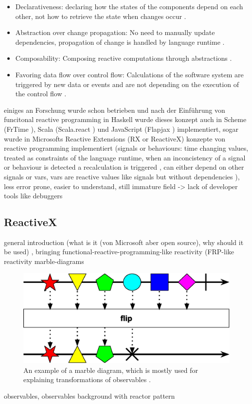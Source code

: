 \documentclass[Bachelor,BIF,english]{twbook}
\begin{document}
\begin{itemize}
\item Declarativeness: declaring how the states of the components depend on each other, not how to retrieve the state when changes occur \cite[p.~2]{PositivEffectOfRP}.
\item Abstraction over change propagation: No need to manually update dependencies, propagation of change is handled by language runtime \cite[p.~2]{PositivEffectOfRP}.
\item Composability: Composing reactive computations through abstractions \cite[p.~2]{PositivEffectOfRP}.
\item Favoring data flow over control flow: Calculations of the software system are triggered by new data or events and are not depending on the execution of the control flow \cite[p.~2]{PositivEffectOfRP}.
\end{itemize}
einiges an Forschung wurde schon betrieben und nach der Einführung von funcitonal reactive programming in Haskell wurde dieses konzept auch in Scheme (FrTime \cite{FrTime}), Scala (Scala.react \cite{DeprecatingOP}) und JavaScript (Flapjax \cite{Flapjax}) implementiert, sogar wurde in Microsofts Reactive Extensions (RX or ReactiveX) konzepte von reactive programming implementiert \cite[p.~954]{RPWalkthrough} \cite[p.~796]{DebuggingRP} \cite[p.~2]{PositivEffectOfRP}
(signals or behaviours: time changing values, treated as constraints of the language runtime, when an inconcistency of a signal or behaviour is detected a recalculation is triggered \cite[p.~797]{DebuggingRP} \cite[p.~3]{PositivEffectOfRP}, can either depend on other signals or vars, vars are reactive values like signals but without dependencies \cite[p.~2]{PositivEffectOfRP}), less error prone, easier to understand, still immature field -> lack of developer tools like debuggers \cite[p.~796]{DebuggingRP}

\subsection{ReactiveX}
general introduction (what is it \cite{ReactiveExtensions} \cite[p.~291]{RxAngular5Prj} (von Microsoft aber open source), why should it be used) \cite{ReactiveX}, bringing functional-reactive-programming-like reactivity (FRP-like reactivity \cite{PositivEffectOfRP}
marble-diagrams
\begin{figure}[!htbp]
\centering
\includegraphics[width=0.5\linewidth]{PICs/marble_diagram.eps}
\caption{An example of a marble diagram, which is mostly used for explaining transformations of observables \cite{RxObservables}.}\label{Fig2}
\end{figure}
observables, observables background with reactor pattern \cite{RxObservables} \cite[p.~292]{RxAngular5Prj} \cite[p.~310]{RxAngular5Prj}
\end{document}
